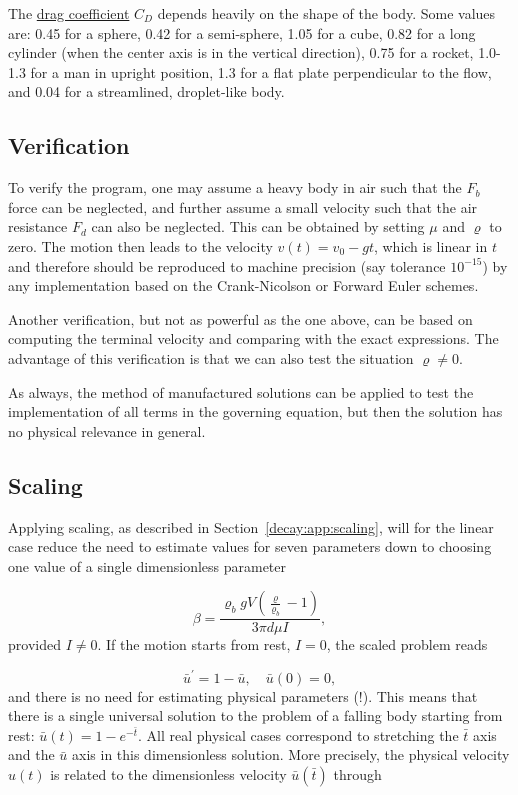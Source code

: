 \documentclass[%
oneside,                 %
final,                   %
10pt]{article}
\begin{document}
The \href{{http://en.wikipedia.org/wiki/Drag_coefficient}}{drag coefficient} $C_D$ depends heavily
on the shape of the body.  Some values are: 0.45 for a sphere, 0.42
for a semi-sphere, 1.05 for a cube, 0.82 for a long cylinder (when the
center axis is in the vertical direction), 0.75 for a rocket,
1.0-1.3 for a man in upright position, 1.3 for a flat plate perpendicular
to the flow, and
0.04 for a streamlined, droplet-like body.

\subsection{Verification}

To verify the program, one may assume a heavy body in air such that the $F_b$
force can be neglected, and further assume a small velocity such that the
air resistance $F_d$ can also be neglected. This can be obtained by
setting $\mu$ and $\varrho$ to zero. The motion then leads to
the velocity
$v(t)=v_0 - gt$, which is linear in $t$ and therefore should be
reproduced to machine precision (say tolerance $10^{-15}$) by any
implementation based on the Crank-Nicolson or Forward Euler schemes.

Another verification, but not as powerful as the one above,
can be based on computing the terminal velocity and comparing with
the exact expressions.
The advantage of this verification is that we can also
test the situation $\varrho\neq 0$.

As always, the method of manufactured solutions can be applied to
test the implementation of all terms in the governing equation, but
then the solution has no physical relevance in general.


\subsection{Scaling}
\label{decay:app:drag:scaling}

Applying scaling, as described in Section~\ref{decay:app:scaling},
will for the linear case reduce the need to estimate values for
seven parameters down to choosing one value of a single dimensionless parameter

\[ \beta = \frac{\varrho_b gV\left(\frac{\varrho}{\varrho_b} -1\right)}{3\pi d\mu I},\]
provided $I\neq 0$. If the motion starts from rest, $I=0$, the scaled
problem reads

\[ \bar u^{\prime}=1-\bar u, \quad \bar u(0)=0,\]
and there is
no need for estimating physical parameters (!).
This means that there is a single universal solution to the problem
of a falling body starting from rest:
$\bar u(t) = 1 - e^{-\bar t}$. All real
physical cases correspond to stretching the $\bar t$ axis and the $\bar u$
axis in this dimensionless solution. More precisely, the physical velocity
$u(t)$ is related to the dimensionless velocity $\bar u(\bar t)$ through
\end{document}
